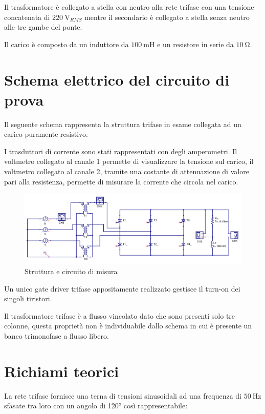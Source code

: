\documentclass[a4paper,10pt]{article}
\begin{document}
Il trasformatore è collegato a stella con neutro alla rete trifase con una tensione
concatenata di $\SI{220}{\volt_{RMS}}$ mentre il secondario è collegato a stella 
senza neutro alle tre gambe del ponte.

Il carico è composto da un induttore da $\SI{100}{\milli\henry}$ e
un resistore in serie da $\SI{10}{\ohm}$.



\section{Schema elettrico del circuito di prova}
Il seguente schema rappresenta la struttura trifase in esame collegata ad un
carico puramente resistivo.

I trasduttori di corrente sono stati rappresentati con degli
amperometri. Il voltmetro collegato al canale 1 permette di visualizzare la 
tensione sul carico, il voltmetro collegato al canale 2, tramite una costante di 
attenuazione di valore pari alla resistenza, permette di misurare 
la corrente che circola nel carico.


\begin{figure}[H]
 \centering
 \includegraphics[keepaspectratio=true,width=1\linewidth]{img/circuito_qucs.png}
 \caption{Struttura e circuito di misura}
 \label{fig:circuito}
\end{figure}

Un unico gate driver trifase appositamente realizzato gestisce il turn-on
dei singoli tiristori.

Il trasformatore trifase è a flusso vincolato dato che sono presenti 
solo tre colonne, questa proprietà non è individuabile dallo schema in cui 
è presente un banco trimonofase a flusso libero.

\section{Richiami teorici}
La rete trifase fornisce una terna di tensioni sinusoidali ad una frequenza di
$\SI{50}{\hertz}$ sfasate tra loro con un angolo di \ang{120}
così rappresentabile:
\end{document}
